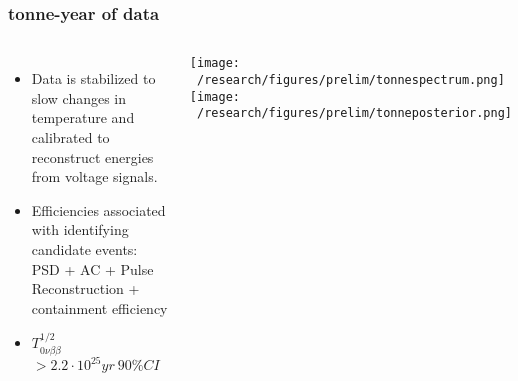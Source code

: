 \documentclass{beamer}
\begin{document}
	\begin{frame}
		\frametitle{tonne-year of data}
		\begin{columns}[c] %
			
			\begin{itemize}
			\item Data is stabilized to slow changes in temperature and calibrated to reconstruct energies from voltage signals.
			\item Efficiencies associated with identifying candidate events: PSD + AC + Pulse Reconstruction + containment efficiency
			\item $T_{0\nu\beta\beta}^{1/2}$ $> 2.2 \cdot 10^{25} yr \ 90\% CI$
			\end{itemize}			 
			
		
			\texttt{[image: ~/research/figures/prelim/tonnespectrum.png]}
			\vspace{-10pt}
			\texttt{[image: ~/research/figures/prelim/tonneposterior.png]}
			
		\end{columns}
	\end{frame}
%			
%			
%		
%			
	
\end{document}
